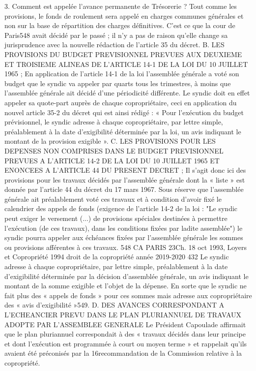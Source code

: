3. Comment est appelée l’avance permanente de Trésorerie ?
Tout comme les provisions, le fonds de roulement sera appelé en charges communes générales et non sur la base de répartition des charges définitives. C’est ce que la cour de Paris548 avait décidé par le passé ; il n’y a pas de raison qu’elle change sa jurisprudence avec la nouvelle rédaction de l’article 35 du décret.
B. LES PROVISIONS DU BUDGET PREVISIONNEL PREVUES AUX DEUXIEME ET TROISIEME ALINEAS DE L'ARTICLE 14-1 DE LA LOI DU 10 JUILLET 1965 ;
En application de l’article 14-1 de la loi l'assemblée générale a voté son budget que le syndic va appeler par quarts tous les trimestres, à moins que l'assemblée générale ait décidé d’une périodicité différente.
Le syndic doit en effet appeler sa quote-part auprès de chaque copropriétaire, ceci en application du nouvel article 35-2 du décret qui est ainsi rédigé :
« Pour l'exécution du budget prévisionnel, le syndic adresse à chaque copropriétaire, par lettre simple, préalablement à la date d'exigibilité déterminée par la loi, un avis indiquant le montant de la provision exigible ».
C. LES PROVISIONS POUR LES DEPENSES NON COMPRISES DANS LE BUDGET PREVISIONNEL PREVUES A L'ARTICLE 14-2 DE LA LOI DU 10 JUILLET 1965 ET ENONCEES A L'ARTICLE 44 DU PRESENT DECRET ;
Il s’agit donc ici des provisions pour les travaux décidés par l’assemblée générale dont la « liste » est donnée par l’article 44 du décret du 17 mars 1967.
Sous réserve que l’assemblée générale ait préalablement voté ces travaux et à condition d’avoir fixé le calendrier des appels de fonds (exigence de l’article 14-2 de la loi : "Le syndic peut exiger le versement (...) de provisions spéciales destinées à permettre l'exécution (de ces travaux), dans les conditions fixées par ladite assemblée") le syndic pourra appeler aux échéances fixées par l'assemblée générale les sommes ou provisions afférentes à ces travaux.
548 CA PARIS 23\degres Ch. 18 oct 1993, Loyers et Copropriété 1994 
droit de la copropriété année 2019-2020
432
Le syndic adresse à chaque copropriétaire, par lettre simple, préalablement à la date d'exigibilité déterminée par la décision d'assemblée générale, un avis indiquant le montant de la somme exigible et l'objet de la dépense. En sorte que le syndic ne fait plus des « appels de fonds » pour ces sommes mais adresse aux copropriétaire des « avis d’exigibilité »549.
D. DES AVANCES CORRESPONDANT A L'ECHEANCIER PREVU DANS LE PLAN PLURIANNUEL DE TRAVAUX ADOPTE PAR L'ASSEMBLEE GENERALE
Le Président Capoulade affirmait que le plan pluriannuel correspondait à des « travaux décidés dans leur principe et dont l’exécution est programmée à court ou moyen terme » et rappelait qu’ils avaient été préconisés par la 16\degres recommandation de la Commission relative à la copropriété.
